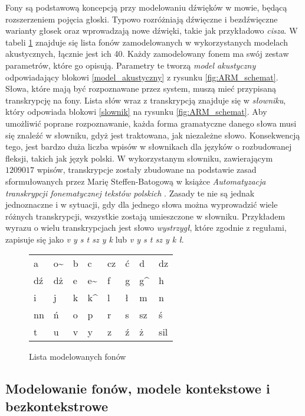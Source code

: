\documentclass[11pt]{article}
\newcommand{\refBlock}[1]{%
	\hyperref[#1]{\ref*{#1}}%
}
\begin{document}
		Fony są podstawową koncepcją przy modelowaniu dźwięków w mowie, będącą rozszerzeniem pojęcia głoski. Typowo rozróżniają dźwięczne i bezdźwięczne warianty głosek oraz wprowadzają nowe dźwięki, takie jak przykładowo \textit{cisza}. W tabeli \ref{tab:phone_list} znajduje się lista fonów zamodelowanych w wykorzystanych modelach akustycznych, łącznie jest ich 40. Każdy zamodelowany fonem ma swój zestaw parametrów, które go opisują. Parametry te tworzą \textit{model akustyczny} odpowiadający blokowi \ref{model_akustyczny} z rysunku \ref{fig:ARM_schemat}. Słowa, które mają być rozpoznawane przez system, muszą mieć przypisaną transkrypcję na fony. Lista słów wraz z transkrypcją znajduje się w \textit{słowniku}, który odpowiada blokowi \refBlock{slownik} na rysunku \ref{fig:ARM_schemat}. Aby umożliwić poprane rozpoznawanie, każda forma gramatyczne danego słowa musi się znaleźć w słowniku, gdyż jest traktowana, jak niezależne słowo. Konsekwencją tego, jest bardzo duża liczba wpisów w słownikach dla języków o rozbudowanej fleksji, takich jak język polski. 
		W wykorzystanym słowniku, zawierającym $1209017$ wpisów, transkrypcje zostały zbudowane na podstawie zasad sformułowanych przez Marię Steffen-Batogową w książce \textit{Automatyzacja transkrypcji fonematycznej tekstów polskich} \cite{transkrypcja}. Zasady te nie są jednak jednoznaczne i w sytuacji, gdy dla jednego słowa można wyprowadzić wiele różnych transkrypcji, wszystkie zostają umieszczone w słowniku. Przykładem wyrazu o wielu transkrypcjach jest słowo \textit{wystrzygł}, które zgodnie z regułami, zapisuje się jako \textit{v y s t sz y k} lub \textit{v y s t sz y k ł}.  

		\begin{figure}
			\begin{tabular}{|K{1cm}K{1cm}K{1cm}K{1cm}K{1cm}K{1cm}K{1cm}K{1cm}|}
				\hline
				a  & o\~ & b & c & cz & ć & d & dz \\ 
				dź & dż & e & e\~ & f & g & g\^ & h \\
				i & j & k & k\^ & l & ł & m & n \\
				nn & ń & o & p  & r & s & sz & ś \\
				t & u & v & y & z & ź & ż & sil \\
				\hline
			\end{tabular}
			\caption{\label{tab:phone_list}Lista modelowanych fonów}
		\end{figure}
 

	\subsection{ Modelowanie fonów, modele kontekstowe i bezkontekstrowe }
		
\end{document}
